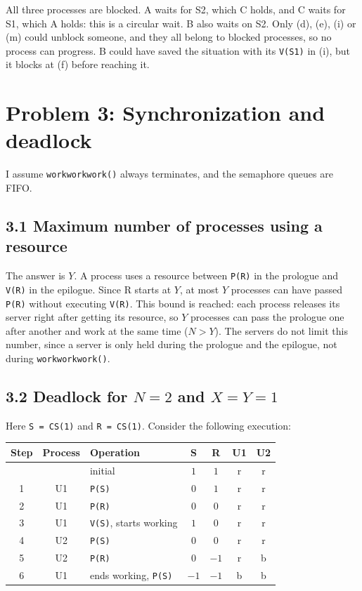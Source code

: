 \documentclass[letterpaper, 11pt]{article}
\newcommand{\1}{\mathds{1}}	%
\theoremstyle{definition}
\begin{document}
All three processes are blocked. A waits for S2, which C holds, and C waits for S1, which A holds: this is a circular wait. B also waits on S2. Only (d), (e), (i) or (m) could unblock someone, and they all belong to blocked processes, so no process can progress. B could have saved the situation with its \texttt{V(S1)} in (i), but it blocks at (f) before reaching it.

\section*{Problem 3: Synchronization and deadlock}

I assume \texttt{workworkwork()} always terminates, and the semaphore queues are FIFO.

\subsection*{3.1 Maximum number of processes using a resource}

The answer is $Y$. A process uses a resource between \texttt{P(R)} in the prologue and \texttt{V(R)} in the epilogue. Since R starts at $Y$, at most $Y$ processes can have passed \texttt{P(R)} without executing \texttt{V(R)}. This bound is reached: each process releases its server right after getting its resource, so $Y$ processes can pass the prologue one after another and work at the same time ($N > Y$). The servers do not limit this number, since a server is only held during the prologue and the epilogue, not during \texttt{workworkwork()}.

\subsection*{3.2 Deadlock for $N = 2$ and $X = Y = 1$}

Here \texttt{S = CS(1)} and \texttt{R = CS(1)}. Consider the following execution:

\begin{center}
\begin{tabular}{cclcccc}
\toprule
Step & Process & Operation & S & R & U1 & U2 \\
\midrule
  &    & initial                        & $1$  & $1$  & r & r \\
1 & U1 & \texttt{P(S)}                  & $0$  & $1$  & r & r \\
2 & U1 & \texttt{P(R)}                  & $0$  & $0$  & r & r \\
3 & U1 & \texttt{V(S)}, starts working   & $1$  & $0$  & r & r \\
4 & U2 & \texttt{P(S)}                  & $0$  & $0$  & r & r \\
5 & U2 & \texttt{P(R)}                  & $0$  & $-1$ & r & b \\
6 & U1 & ends working, \texttt{P(S)}    & $-1$ & $-1$ & b & b \\
\bottomrule
\end{tabular}
\end{center}
\end{document}
